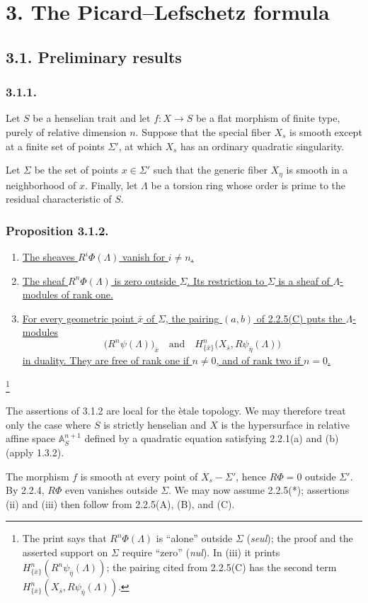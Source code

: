 \section*{3. The Picard--Lefschetz formula}

\subsection*{3.1. Preliminary results}

\subsubsection*{3.1.1.}
Let $S$ be a henselian trait and let $f:X\to S$ be a flat morphism
of finite type, purely of relative dimension $n$.  Suppose that the
special fiber $X_s$ is smooth except at a finite set of points
$\Sigma'$, at which $X_s$ has an ordinary quadratic singularity.

Let $\Sigma$ be the set of points $x\in\Sigma'$ such that the
generic fiber $X_\eta$ is smooth in a neighborhood of $x$.  Finally,
let $\Lambda$ be a torsion ring whose order is prime to the residual
characteristic of $S$.

\subsubsection*{Proposition 3.1.2.}
\begin{enumerate}
\item[(i)] \underline{The sheaves $R^i\Phi(\Lambda)$ vanish for
$i\ne n$.}

\item[(ii)] \underline{The sheaf $R^n\Phi(\Lambda)$ is zero outside
$\Sigma$.  Its restriction to $\Sigma$ is a sheaf of
$\Lambda$-modules of rank one.}

\item[(iii)] \underline{For every geometric point $\bar x$ of
$\Sigma$, the pairing $(a,b)$ of 2.2.5(C) puts the $\Lambda$-modules}
\[
\bigl(R^n\psi(\Lambda)\bigr)_{\bar x}
\quad\text{and}\quad
H^n_{\{\bar x\}}\bigl(X_{\bar s},R\psi_{\bar\eta}(\Lambda)\bigr)
\]
\underline{in duality.  They are free of rank one if $n\ne0$, and
of rank two if $n=0$.}
\end{enumerate}
\footnote{The print says that $R^n\Phi(\Lambda)$ is ``alone''
outside $\Sigma$ (\emph{seul}); the proof and the asserted support on
$\Sigma$ require ``zero'' (\emph{nul}).  In (iii) it prints
$H^n_{\{\bar x\}}(R^n\psi_{\bar\eta}(\Lambda))$; the pairing cited
from 2.2.5(C) has the second term
$H^n_{\{\bar x\}}(X_{\bar s},R\psi_{\bar\eta}(\Lambda))$.}

The assertions of 3.1.2 are local for the \`etale topology.  We may
therefore treat only the case where $S$ is strictly henselian and
$X$ is the hypersurface in relative affine space
$\mathbb A^{n+1}_S$ defined by a quadratic equation satisfying
2.2.1(a) and (b) (apply 1.3.2).

The morphism $f$ is smooth at every point of $X_s-\Sigma'$, hence
$R\Phi=0$ outside $\Sigma'$.  By 2.2.4, $R\Phi$ even vanishes outside
$\Sigma$.  We may now assume 2.2.5(*); assertions (ii) and (iii) then
follow from 2.2.5(A), (B), and (C).
